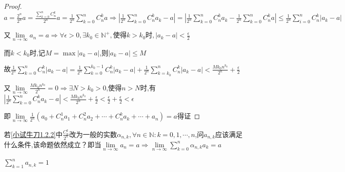 \begin{proof}
    $a = \frac{2^n}{2^n} a
        =\frac{\sum\limits_{k=0}^{n} C_n^k}{2^n} a
        =\frac{1}{2^n} \sum\limits_{k=0}^{n} C_n^k a \Longrightarrow |\frac{1}{2^n} \sum\limits_{k=0}^{n} C_n^k a_k - a|
        =|\frac{1}{2^n} \sum\limits_{k=0}^{n} C_n^k a_k - \frac{1}{2^n} \sum\limits_{k=0}^{n} C_n^k a|
        \le \frac{1}{2^n} \sum\limits_{i=0}^{n} C_n^k |a_k-a|$

    又$\lim \limits_{n \to \infty} a_n = a
        \Longrightarrow \forall \epsilon>0,\exists k_0 \in \mathbb{N}^+,\mbox{使得}k>k_0时,|a_k-a|<\frac{\epsilon}{2}$

    而$k<k_0$时,记$M=\max |a_k-a|$,则$|a_k-a|\le M$

    故$\frac{1}{2^n} \sum\limits_{k=0}^{n} C_n^k |a_k-a|=\frac{1}{2^n} \sum\limits_{k=0}^{k_0-1} C_n^k |a_k-a| + \frac{1}{2^n} \sum\limits_{k=k_0}^{n} C_n^k |a_k-a|< \frac{Mk_0n^{k_0}}{2^n} + \frac{\epsilon}{2}$

    又$\lim \limits_{n \to \infty} \frac{Mk_0n^{k_0}}{2^n}=0 \Longrightarrow \exists N>k_0>0$,使得$n>N$时,有$|\frac{1}{2^n} \sum\limits_{k=0}^{n} C_n^k a_k - a| < \frac{Mk_0n^{k_0}}{2^n} + \frac{\epsilon}{2}<\frac{\epsilon}{2} + \frac{\epsilon}{2}<\epsilon$

    即$\lim \limits_{n \to \infty} \frac{1}{2^n} (a_0+C_n^1 a_1 + C_n^2 a_2 + \cdots + C_n^k a_k + \cdots + a_n)=a$得证
\end{proof}

\begin{practice}
    若\cref{小试牛刀1.2.2}中$\frac{C_n^k}{2^n}$改为一般的实数$\alpha_{n,k},\forall n\in \mathbb{N}:k=0,1,\cdots,n$,问$a_{n,k}$应该满足什么条件,该命题依然成立？即当$\lim \limits_{n \to \infty}a_n=a\Longrightarrow \lim \limits_{n \to \infty} \sum\limits_{k=0}^{n} \alpha_{n,k}a_k=a$
\end{practice}

\begin{solution}
    $\sum\limits_{k=1}^{n} a_{n,k}=1$
\end{solution}